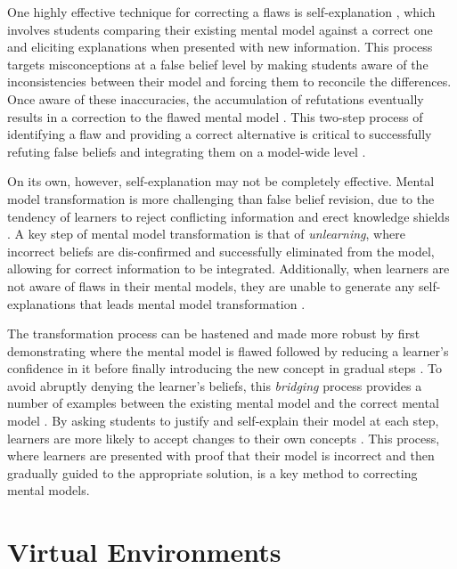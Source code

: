 One highly effective technique for correcting a flaws is self-explanation \citep{Chi1994}, which involves students comparing their existing mental model against a correct one and eliciting explanations when presented with new information. This process targets misconceptions at a false belief level by making students aware of the inconsistencies between their model and forcing them to reconcile the differences. Once aware of these inaccuracies, the accumulation of refutations eventually results in a correction to the flawed mental model \citep{Chi2008}. This two-step process of identifying a flaw and providing a correct alternative is critical to successfully refuting false beliefs and integrating them on a model-wide level \citep{Chi1994, Klein2006}.

On its own, however, self-explanation may not be completely effective. Mental model transformation is more challenging than false belief revision, due to the tendency of learners to reject conflicting information and erect knowledge shields \citep{Klein2006}. A key step of mental model transformation is that of \emph{unlearning}, where incorrect beliefs are dis-confirmed and successfully eliminated from the model, allowing for correct information to be integrated. Additionally, when learners are not aware of flaws in their mental models, they are unable to generate any self-explanations \citep{Chi2002} that leads mental model transformation \citep{Chi2008}.

The transformation process can be hastened and made more robust by first demonstrating where the mental model is flawed followed by reducing a learner's confidence in it before finally introducing the new concept in gradual steps \citep{Klein2006}. To avoid abruptly denying the learner's beliefs, this \emph{bridging} process provides a number of examples between the existing mental model and the correct mental model \citep{Brown1989}. By asking students to justify and self-explain their model at each step, learners are more likely to accept changes to their own concepts \citep{Brown1989, Chi2008, Chi1994, Klein2006}. This process, where learners are presented with proof that their model is incorrect and then gradually guided to the appropriate solution, is a key method to correcting mental models.

\section{Virtual Environments}

